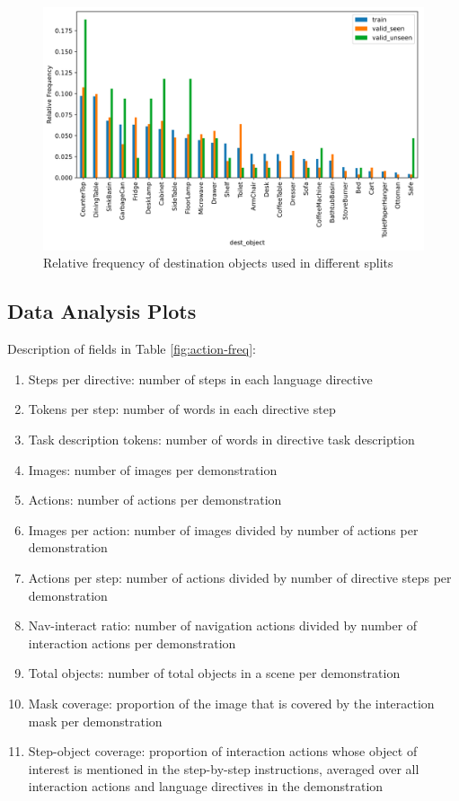 \documentclass[11pt,a4paper]{article}
\begin{document}
\begin{figure}
    \centering
    \includegraphics[scale=0.5]{figures/dest_obj_freqs.png}
    \caption{Relative frequency of destination objects used in different splits}
    \label{fig:dest}
\end{figure}


\subsection{Data Analysis Plots}

Description of fields in Table \ref{fig:action-freq}:
\begin{enumerate}
    \item Steps per directive: number of steps in each language directive
    \item Tokens per step: number of words in each directive step
    \item Task description tokens: number of words in directive task description
    \item Images: number of images per demonstration
    \item Actions: number of actions per demonstration
    \item Images per action: number of images divided by number of actions per demonstration
    \item Actions per step: number of actions divided by number of directive steps per demonstration
    \item Nav-interact ratio: number of navigation actions divided by number of interaction actions per demonstration
    \item Total objects: number of total objects in a scene per demonstration
    \item Mask coverage: proportion of the image that is covered by the interaction mask per demonstration
    \item Step-object coverage: proportion of interaction actions whose object of interest is mentioned in the step-by-step instructions, averaged over all interaction actions and language directives in the demonstration
\end{enumerate}
\end{document}
